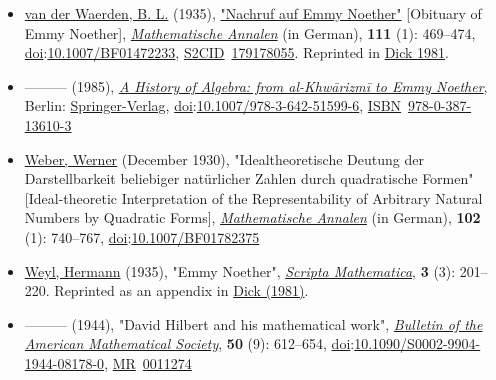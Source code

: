 \begin{itemize}
\item
  \href{https://en.wikipedia.org/wiki/Bartel_Leendert_van_der_Waerden}{van der Waerden, B. L.} (1935), \href{https://doi.org/10.1007\%2FBF01472233}{"Nachruf auf Emmy Noether"} {{[}}Obituary of Emmy Noether{{]}}, \emph{\href{https://en.wikipedia.org/wiki/Mathematische_Annalen}{Mathematische Annalen}} (in German), \textbf{111} (1): {469--}474, \href{https://en.wikipedia.org/wiki/Doi_(identifier)}{doi}:{\href{https://doi.org/10.1007\%2FBF01472233}{10.1007/BF01472233}}, \href{https://en.wikipedia.org/wiki/S2CID_(identifier)}{S2CID}{~}\href{https://api.semanticscholar.org/CorpusID:179178055}{179178055}{}. Reprinted in \href{https://en.wikipedia.org/wiki/Emmy_Noether\#CITEREFDick1981}{Dick 1981}.
\item
  {---}{---}{---} (1985), \href{https://link.springer.com/book/10.1007/978-3-642-51599-6}{\emph{A History of Algebra: from al-Khwārizmī to Emmy Noether}}, Berlin: \href{https://en.wikipedia.org/wiki/Springer-Verlag}{Springer-Verlag}, \href{https://en.wikipedia.org/wiki/Doi_(identifier)}{doi}:\href{https://doi.org/10.1007\%2F978-3-642-51599-6}{10.1007/978-3-642-51599-6}, \href{https://en.wikipedia.org/wiki/ISBN_(identifier)}{ISBN}{~}\href{https://en.wikipedia.org/wiki/Special:BookSources/978-0-387-13610-3}{978-0-387-13610-3}{}
\item
  \href{https://en.wikipedia.org/wiki/Werner_Weber_(mathematician)}{Weber, Werner} (December 1930), "Idealtheoretische Deutung der Darstellbarkeit beliebiger natürlicher Zahlen durch quadratische Formen" {{[}}Ideal-theoretic Interpretation of the Representability of Arbitrary Natural Numbers by Quadratic Forms{{]}}, \emph{\href{https://en.wikipedia.org/wiki/Mathematische_Annalen}{Mathematische Annalen}} (in German), \textbf{102} (1): {740--}767, \href{https://en.wikipedia.org/wiki/Doi_(identifier)}{doi}:\href{https://doi.org/10.1007\%2FBF01782375}{10.1007/BF01782375}{}
\item
  \href{https://en.wikipedia.org/wiki/Hermann_Weyl}{Weyl, Hermann} (1935), "Emmy Noether", \emph{\href{https://en.wikipedia.org/wiki/Scripta_Mathematica}{Scripta Mathematica}}, \textbf{3} (3): {201--}220{}. Reprinted as an appendix in \href{https://en.wikipedia.org/wiki/Emmy_Noether\#CITEREFDick1981}{Dick (1981)}.
\item
  {---}{---}{---} (1944), "David Hilbert and his mathematical work", \emph{\href{https://en.wikipedia.org/wiki/Bulletin_of_the_American_Mathematical_Society}{Bulletin of the American Mathematical Society}}, \textbf{50} (9): {612--}654, \href{https://en.wikipedia.org/wiki/Doi_(identifier)}{doi}:{\href{https://doi.org/10.1090\%2FS0002-9904-1944-08178-0}{10.1090/S0002-9904-1944-08178-0}}, \href{https://en.wikipedia.org/wiki/MR_(identifier)}{MR}{~}\href{https://mathscinet.ams.org/mathscinet-getitem?mr=0011274}{0011274}{}

\end{itemize}
